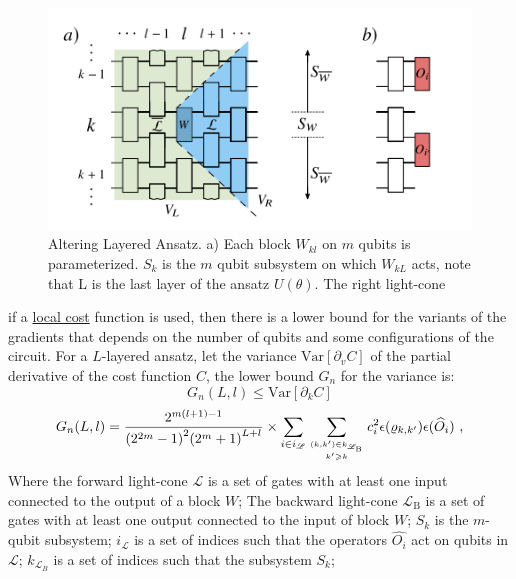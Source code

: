 \begin{figure}
    \centering
    \includegraphics{LiteratureReview/Appendices/alterlayeransatz.png}
    \caption{
        Altering Layered Ansatz. 
        a) Each block $W_{kl}$ on $m$ qubits is parameterized.
        $S_k$ is the $m$ qubit subsystem on which $W_{kL}$ acts, note that L is the last layer of the ansatz $U(\theta)$.
        The right light-cone
    }
    \label{Altering Layered Ansatz}
\end{figure}

if a \underline{local cost} function is used, then there is a lower bound for the variants of the gradients that depends on the number of qubits and some configurations of the circuit. 
For a $L$-layered ansatz, let the variance $\mathrm{Var}[\partial_v C]$ of the partial derivative of the cost function $C$, the lower bound $G_n$ for the variance is:
\begin{equation}
    G_n(L,l) \leq \mathrm{Var}[\partial_k C]
\end{equation}
\begin{equation}
    G_n(L,l) = \frac{{2}^{m(l+1)-1}}{{({2}^{2m}-1)}^{2}{({2}^{m}+1)}^{L+l}}
    \times \mathop{\sum}\limits_{i\in {i}_{{\mathcal{L}}}}\mathop{\sum}\limits _{{(k,k^{\prime} )\in {k}_{{{\mathcal{L}}}_{\text{B}}}}\atop {k^{\prime} \geqslant k}}{c}_{i}^{2}\epsilon ({\rho }_{k,k^{\prime} })\epsilon ({\widehat{O}}_{i})\ ,
\end{equation}
Where the forward light-cone $\mathcal{L}$ is a set of gates with at least one input connected to the output of a block $W$; 
The backward light-cone $\mathcal{L}_\text{B}$ is a set of gates with at least one output connected to the input of block $W$;
$S_k$ is the $m$-qubit subsystem;
$i_{\mathcal{L}}$ is a set of indices such that the operators $\hat{O_i}$ act on qubits in $\mathcal{L}$;
$k_{\mathcal{L}_B}$ is a set of indices such that the subsystem $S_k$;

